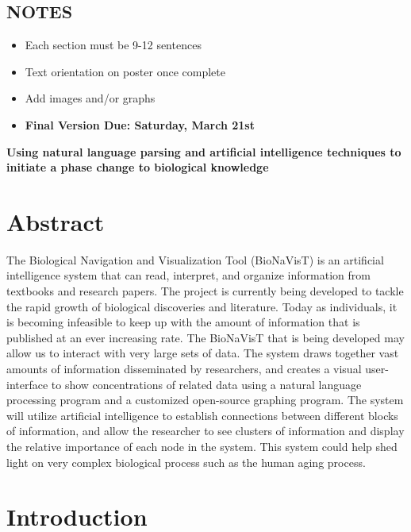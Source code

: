 \documentclass[11pt]{article}
\begin{document}
\subsection*{NOTES}
\begin{itemize}
\item Each section must be 9-12 sentences
\item Text orientation on poster once complete
\item Add images and/or graphs 
\item \textbf{Final Version Due: Saturday, March 21st}
\end{itemize}

\begin{flushleft}
  \vspace{3mm}
         {\bf Using natural language parsing and artificial intelligence techniques to initiate a phase change to biological knowledge}\\
\end{flushleft}

\section{Abstract}

The Biological Navigation and Visualization Tool (BioNaVisT) is an artificial intelligence system that can read, interpret, and organize information from textbooks and research papers. The project is currently being developed to tackle the rapid growth of biological discoveries and literature. Today as individuals, it is becoming infeasible to keep up with the amount of information that is published at an ever increasing rate. The BioNaVisT that is being developed may allow us to interact with very large sets of data. The system draws together vast amounts of information disseminated by researchers, and creates a visual user-interface to show concentrations of related data using a natural language processing program and a customized open-source graphing program. The system will utilize artificial intelligence to establish connections between different blocks of information, and allow the researcher to see clusters of information and display the relative importance of each node in the system. This system could help shed light on very complex biological process such as the human aging process.

\section{Introduction}
\end{document}
